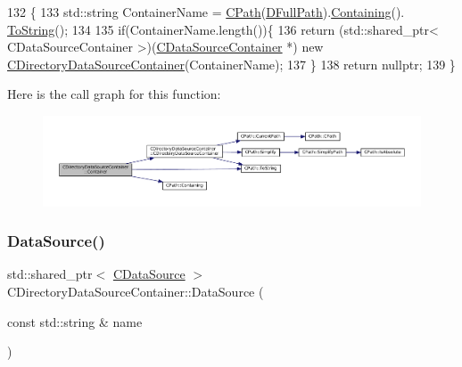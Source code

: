 \begin{DoxyCode}
132                                                                               \{
133     std::string ContainerName = \hyperlink{classCPath}{CPath}(\hyperlink{classCDirectoryDataSourceContainer_ac3d3c7e7d7bc9f68ba8a8747a3dee8b5}{DFullPath}).\hyperlink{classCPath_a24d8c455b1663ce251d3a749437fa4fe}{Containing}().
      \hyperlink{classCPath_abbafaf377a7e38e0151bd9567d526951}{ToString}();
134     
135     \textcolor{keywordflow}{if}(ContainerName.length())\{
136         \textcolor{keywordflow}{return} (std::shared\_ptr< CDataSourceContainer >)(\hyperlink{classCDataSourceContainer}{CDataSourceContainer} *) \textcolor{keyword}{new} 
      \hyperlink{classCDirectoryDataSourceContainer_a62ef6d44201c6be66421b6c247f3b3bf}{CDirectoryDataSourceContainer}(ContainerName);
137     \}
138     \textcolor{keywordflow}{return} \textcolor{keyword}{nullptr};
139 \}
\end{DoxyCode}
Here is the call graph for this function\+:\nopagebreak
\begin{figure}[H]
\begin{center}
\leavevmode
\includegraphics[width=350pt]{classCDirectoryDataSourceContainer_a5a498db9b312c223b0816fc6cc1fcd3d_cgraph}
\end{center}
\end{figure}
\hypertarget{classCDirectoryDataSourceContainer_ac925eec9c2c71654d0012bff92a462d4}{}\label{classCDirectoryDataSourceContainer_ac925eec9c2c71654d0012bff92a462d4} 
\subsubsection{\texorpdfstring{Data\+Source()}{DataSource()}}
{\footnotesize\ttfamily std\+::shared\+\_\+ptr$<$ \hyperlink{classCDataSource}{C\+Data\+Source} $>$ C\+Directory\+Data\+Source\+Container\+::\+Data\+Source (\begin{DoxyParamCaption}\item[{const std\+::string \&}]{name }\end{DoxyParamCaption})\hspace{0.3cm}{\ttfamily [virtual]}}



